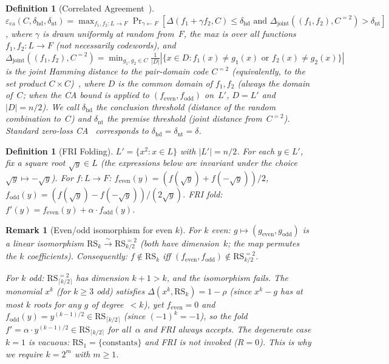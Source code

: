 \documentclass[11pt]{article}
\newtheorem{definition}[theorem]{Definition}
\newtheorem{remark}[theorem]{Remark}
\newcommand{\RS}{\mathrm{RS}}
\begin{document}
\begin{definition}[Correlated Agreement~\cite{ABF}]
\label{def:ca}
$\varepsilon_{\mathrm{ca}}(C, \delta_{\mathrm{hd}}, \delta_{\mathrm{nt}}) = \max_{f_1, f_2: L \to F} \Pr_{\gamma \leftarrow F}[\Delta(f_1 {+} \gamma f_2, C) \leq \delta_{\mathrm{hd}} \text{ and } \Delta_{\mathrm{joint}}((f_1, f_2), C^{=2}) > \delta_{\mathrm{nt}}]$,
where $\gamma$ is drawn uniformly at random from~$F$, the max is over all functions $f_1, f_2: L \to F$ (not necessarily codewords), and $\Delta_{\mathrm{joint}}((f_1, f_2), C^{=2}) = \min_{g_1, g_2 \in C} \tfrac{1}{|D|}|\{x \in D : f_1(x) {\neq} g_1(x) \text{ or } f_2(x) {\neq} g_2(x)\}|$ is the joint Hamming distance to the pair-domain code $C^{=2}$ (equivalently, to the set product $C \times C$)~\cite{BCIKS}, where $D$ is the common domain of $f_1, f_2$ (always the domain of~$C$; when the CA bound is applied to $(f_{\mathrm{even}}, f_{\mathrm{odd}})$ on~$L'$, $D = L'$ and $|D| = n/2$). We call $\delta_{\mathrm{hd}}$ the \emph{conclusion threshold} (distance of the random combination to~$C$) and $\delta_{\mathrm{nt}}$ the \emph{premise threshold} (joint distance from~$C^{=2}$). Standard zero-loss CA~\cite{ABF} corresponds to $\delta_{\mathrm{hd}} = \delta_{\mathrm{nt}} = \delta$.
\end{definition}

\begin{definition}[FRI Folding]
\label{def:fri-folding}
$L' = \{x^2 : x \in L\}$ with $|L'| = n/2$. For each $y \in L'$, fix a square root $\sqrt{y} \in L$ (the expressions below are invariant under the choice $\sqrt{y} \mapsto -\sqrt{y}$). For $f: L \to F$:
$f_{\mathrm{even}}(y) = (f(\sqrt{y}) + f(-\sqrt{y}))/2$,
$f_{\mathrm{odd}}(y) = (f(\sqrt{y}) - f(-\sqrt{y}))/(2\sqrt{y})$.
FRI fold: $f'(y) = f_{\mathrm{even}}(y) + \alpha \cdot f_{\mathrm{odd}}(y)$.
\end{definition}

\begin{remark}[Even/odd isomorphism for even $k$]
\label{rem:k-parity}
For $k$ even: $g \mapsto (g_{\mathrm{even}}, g_{\mathrm{odd}})$ is a linear isomorphism $\RS_k \xrightarrow{\sim} \RS_{k/2}^{=2}$ (both have dimension~$k$; the map permutes the $k$ coefficients). Consequently: $f \notin \RS_k$ iff $(f_{\mathrm{even}}, f_{\mathrm{odd}}) \notin \RS_{k/2}^{=2}$.

For $k$ odd: $\RS_{\lceil k/2 \rceil}^{=2}$ has dimension $k{+}1 > k$, and the isomorphism fails. The monomial $x^k$ (for $k \geq 3$ odd) satisfies $\Delta(x^k, \RS_k) = 1{-}\rho$ (since $x^k - g$ has at most $k$ roots for any $g$ of degree~${<}k$), yet $f_{\mathrm{even}} = 0$ and $f_{\mathrm{odd}}(y) = y^{(k-1)/2} \in \RS_{\lceil k/2 \rceil}$ (since $(-1)^k = -1$), so the fold $f' = \alpha \cdot y^{(k-1)/2} \in \RS_{\lceil k/2 \rceil}$ for all~$\alpha$ and FRI always accepts. The degenerate case $k = 1$ is vacuous: $\RS_1 = \{\text{constants}\}$ and FRI is not invoked ($R = 0$). This is why we require $k = 2^m$ with $m \geq 1$.
\end{remark}
\end{document}
